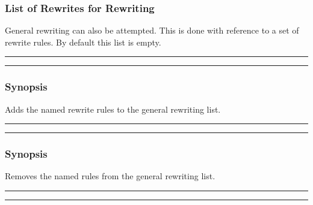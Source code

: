 \subsubsection{List of Rewrites for Rewriting}
General rewriting can also be attempted.  This is done with reference
to a set of rewrite rules.  By default this list is empty.

\vspace{2mm}
\hrule
\vspace{2mm}
\begin{Large}
\end{Large}
\vspace{2mm}
\hrule
\vspace{2mm}


\subsubsection*{Synopsis}
Adds the named rewrite rules to the general rewriting
list.

\vspace{2mm}
\hrule
\vspace{2mm}
\begin{Large}
\end{Large}
\vspace{2mm}
\hrule
\vspace{2mm}


\subsubsection*{Synopsis}
Removes the named rules from the general rewriting list.

\vspace{2mm}
\hrule
\vspace{2mm}
\begin{Large}
\end{Large}
\vspace{2mm}
\hrule
\vspace{2mm}


